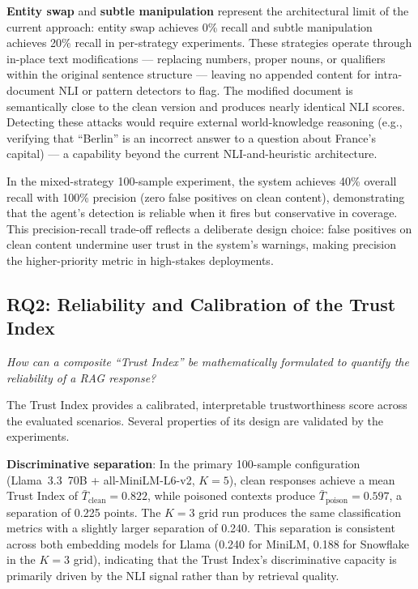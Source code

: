 \textbf{Entity swap} and \textbf{subtle manipulation} represent the architectural limit of the current approach: entity swap achieves 0\% recall and subtle manipulation achieves 20\% recall in per-strategy experiments. These strategies operate through in-place text modifications --- replacing numbers, proper nouns, or qualifiers within the original sentence structure --- leaving no appended content for intra-document NLI or pattern detectors to flag. The modified document is semantically close to the clean version and produces nearly identical NLI scores. Detecting these attacks would require external world-knowledge reasoning (e.g., verifying that ``Berlin'' is an incorrect answer to a question about France's capital) --- a capability beyond the current NLI-and-heuristic architecture.

In the mixed-strategy 100-sample experiment, the system achieves 40\% overall recall with 100\% precision (zero false positives on clean content), demonstrating that the agent's detection is reliable when it fires but conservative in coverage. This precision-recall trade-off reflects a deliberate design choice: false positives on clean content undermine user trust in the system's warnings, making precision the higher-priority metric in high-stakes deployments.

\subsection{RQ2: Reliability and Calibration of the Trust Index}

\textit{How can a composite ``Trust Index'' be mathematically formulated to quantify the reliability of a RAG response?}

The Trust Index provides a calibrated, interpretable trustworthiness score across the evaluated scenarios. Several properties of its design are validated by the experiments.

\textbf{Discriminative separation}: In the primary 100-sample configuration (Llama~3.3~70B + all-MiniLM-L6-v2, $K=5$), clean responses achieve a mean Trust Index of $\bar{T}_{\text{clean}} = 0.822$, while poisoned contexts produce $\bar{T}_{\text{poison}} = 0.597$, a separation of 0.225 points. The $K=3$ grid run produces the same classification metrics with a slightly larger separation of 0.240. This separation is consistent across both embedding models for Llama (0.240 for MiniLM, 0.188 for Snowflake in the $K=3$ grid), indicating that the Trust Index's discriminative capacity is primarily driven by the NLI signal rather than by retrieval quality.

